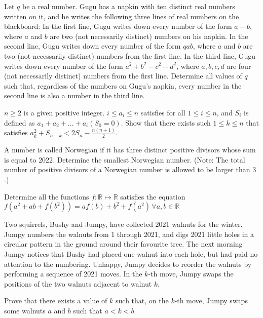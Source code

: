 \documentclass[11pt]{scrartcl}
\begin{document}
\begin{problem}[653318686726030]
Let $q$ be a real number. Gugu has a napkin with ten distinct real numbers written on it, and he writes the following three lines of real numbers on the blackboard:
In the first line, Gugu writes down every number of the form $a-b$, where $a$ and $b$ are two (not necessarily distinct) numbers on his napkin.
In the second line, Gugu writes down every number of the form $qab$, where $a$ and $b$ are
two (not necessarily distinct) numbers from the first line.
In the third line, Gugu writes down every number of the form $a^2+b^2-c^2-d^2$, where $a, b, c, d$ are four (not necessarily distinct) numbers from the first line.
Determine all values of $q$ such that, regardless of the numbers on Gugu's napkin, every number in the second line is also a number in the third line.
\end{problem}
\begin{problem}[655207782865052]
$n\ge2$ is a given positive integer. $i\leq a_i \leq n$ satisfies for all $1\leq i\leq n$, and $S_i$ is defined as $a_1+a_2+...+a_i(S_0=0)$. Show that there exists such $1\leq k\leq n$ that satisfies $a_k^2+S_{n-k}<2S_n-\frac{n(n+1)}{2}$.
\end{problem}
\begin{problem}[660403976209529]
A number is called Norwegian if it has three distinct positive divisors whose sum is equal to $2022$. Determine the smallest Norwegian number.
(Note: The total number of positive divisors of a Norwegian number is allowed to be larger than $3$.)
\end{problem}
\begin{problem}[664494485253935]
Determine all the functions $f:\mathbb R\mapsto\mathbb R$ satisfies the equation
$f(a^2 +ab+ f(b^2))=af(b)+b^2+ f(a^2)\,\forall a,b\in\mathbb R $
\end{problem}
\begin{problem}[669395675904242]
	Two squirrels, Bushy and Jumpy, have collected 2021 walnuts for the winter. Jumpy numbers the walnuts from 1 through 2021, and digs 2021 little holes in a circular pattern in the ground around their favourite tree. The next morning Jumpy notices that Bushy had placed one walnut into each hole, but had paid no attention to the numbering. Unhappy, Jumpy decides to reorder the walnuts by performing a sequence of 2021 moves. In the $k$-th move, Jumpy swaps the positions of the two walnuts adjacent to walnut $k$.

Prove that there exists a value of $k$ such that, on the $k$-th move, Jumpy swaps some walnuts $a$ and $b$ such that $a<k<b$.
\end{problem}
\end{document}
